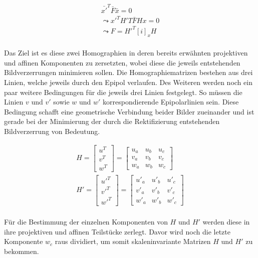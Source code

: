 \begin{gather}
	\bar{x'}^T\bar{F}\bar{x} = 0\\
	\leadsto x'^TH'T\bar{F}Hx=0\\
	\leadsto F = H'^T[i]_xH
\end{gather}\\

Das Ziel ist es diese zwei Homographien in deren bereits erwähnten projektiven und affinen Komponenten zu zersetzten, wobei diese die jeweils entstehenden Bildverzerrungen minimieren sollen. Die Homographiematrizen bestehen aus drei Linien, welche jeweils durch den Epipol verlaufen. Des Weiteren werden noch ein paar weitere Bedingungen für die jeweils drei Linien festgelegt. So müssen die Linien $v$ und $v'$ sowie $w$ und $w'$ korrespondierende Epipolarlinien sein. Diese Bedingung schafft eine geometrische Verbindung beider Bilder zueinander und ist gerade bei der Minimierung der durch die Rektifizierung entstehenden Bildverzerrung von Bedeutung.

\begin{gather}
H = \begin{bmatrix}
u^T\\v^T\\w^T
\end{bmatrix} =
\begin{bmatrix}
u_a&u_b&u_c\\
v_a&v_b&v_c\\
w_a&w_b&w_c
\end{bmatrix}\\
H' = \begin{bmatrix}
u'^T\\v'^T\\w'^T
\end{bmatrix} =
\begin{bmatrix}
u'_a&u'_b&u'_c\\
v'_a&v'_b&v'_c\\
w'_a&w'_b&w'_c
\end{bmatrix}	
\end{gather}\\

Für die Bestimmung der einzelnen Komponenten von $H$ und $H'$ werden diese in ihre projektiven und affinen Teilstücke zerlegt. Davor wird noch die letzte Komponente $w_c$ raus dividiert, um somit  skaleninvariante Matrizen $H$ und $H'$ zu bekommen. 

